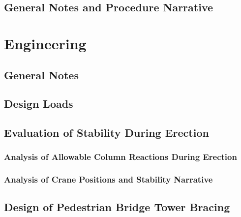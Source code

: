 \documentclass[11pt,letterpaper]{report}
\begin{document}
\section{General Notes and Procedure Narrative}
% 
% 
% 


\setcounter{page}{1}
\renewcommand{\thepage}{}
\chapter{Engineering}
\setcounter{page}{1}
\renewcommand{\thepage}{\arabic{chapter}-\arabic{page}}

\section{General Notes}
% 
\section{Design Loads}
% 
% 
\section{Evaluation of Stability During Erection}
\subsection{Analysis of Allowable Column Reactions During Erection}
% 
\subsection{Analysis of Crane Positions and Stability Narrative}
% 
\section{Design of Pedestrian Bridge Tower Bracing}
\end{document}
